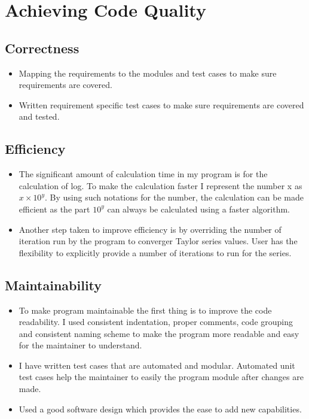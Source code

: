 \documentclass[a4paper,12pt]{article}
\begin{document}
\section{\large Achieving Code Quality}

\subsection{Correctness}
\begin{itemize}
	\item Mapping the requirements to the modules and test cases to make sure requirements are covered.
	\item Written requirement specific test cases to make sure requirements are covered and tested.
\end{itemize}

\subsection{Efficiency}
\begin{itemize}
	\item The significant amount of calculation time in my program is for the calculation of log. To make the calculation faster I represent the number x as $x\times10^y$. By using such notations for the number, the calculation can be made efficient as the part $10^y$ can always be calculated using a faster algorithm.
	\item Another step taken to improve efficiency is by overriding the number of iteration run by the program to converger Taylor series values. User has the flexibility to explicitly provide a number of iterations to run for the series.
\end{itemize}


\subsection{Maintainability}
\begin{itemize}
	\item To make program maintainable the first thing is to improve the code readability. I used consistent indentation, proper comments, code grouping and consistent naming scheme to make the program more readable and easy for the maintainer to understand. 
	\item I have written test cases that are automated and modular. Automated unit test cases help the maintainer to easily the program module after changes are made.
	\item Used a good software design which provides the ease to add new capabilities.	
\end{itemize}
\end{document}
